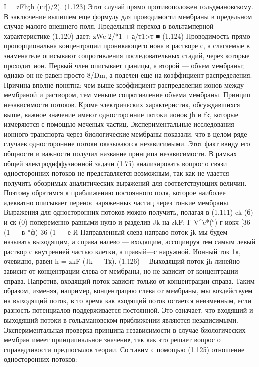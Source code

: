 I = zFh\c th (гт|)/2).	(1.123)
Этот случай прямо противоположен гольдмановскому.
В заключение выпишем еще формулу для проводимости мембраны в предельном случае малого внешнего поля. Предельный переход в вольтамперной характеристике (1.120) дает:
zWc
2/*1 + а/т1>т ■	(1.124)
Проводимость прямо пропорциональна концентрации проникающего иона в растворе с, а слагаемые в знаменателе описывают сопротивления последовательных стадий, через которые проходит ион. Первый член описывает границы, а второй — объем мембраны; однако он не равен просто 8/Dm, а поделен еще на коэффициент распределения. Причина вполне понятна: чем выше коэффициент распределения ионов между мембраной и раствором, тем меньше сопротивление объема мембраны.
Принцип независимости потоков. Кроме электрических характеристик, обсуждавшихся выше, важное значение имеют односторонние потоки ионов jh и fk, которые измеряются с помощью меченых частиц. Экспериментальные исследования ионного транспорта через биологические мембраны показали, что в целом ряде случаев односторонние потоки оказываются независимыми. Этот факт ввиду его общности и важности получил название принципа независимости.
В рамках общей электродиффузионной задачи (1.75) анализировать вопрос о связи односторонних потоков не представляется возможным, так как не удается получить обозримых аналитических выражений для соответствующих величин. Поэтому обратимся к приближению постоянного поля, которое наиболее адекватно описывает перенос заряженных частиц через тонкие мембраны. Выражения для односторонних потоков можно получить, полагая в (1.111) ck (б) и ск (0) попеременно равными нулю и разделив Jk на zkF:
Г	V^c*(°)	г	иокч
[36 (1 — в *ф)	36	(1	—	е	И
Направленный слева направо поток jk мы будем называть выходящим, а справа налево — входящим, ассоциируя тем самым левый раствор с внутренней частью клетки, а правый—с наружной. Ионный ток 1к, очевидно, равен
h = zkF (Jk — Тк).	(1.126) 
Выходящий поток jh линейно зависит от концентрации слева от мембраны, но не зависит от концентрации справа. Напротив, входящий поток зависит только от концентрации справа. Таким образом, изменяя, например, концентрацию слева от мембраны, мы воздействуем на выходящий поток, в то время как входящий поток остается неизменным, если разность потенциалов поддерживается постоянной. Это означает, что входящий и выходящий потоки в гольдмановском приближении являются независимыми. Экспериментальная проверка принципа независимости в случае биологических мембран имеет принципиальное значение, так как это решает вопрос о справедливости предпосылок теории.
Составим с помощью (1.125) отношение односторонних потоков:
